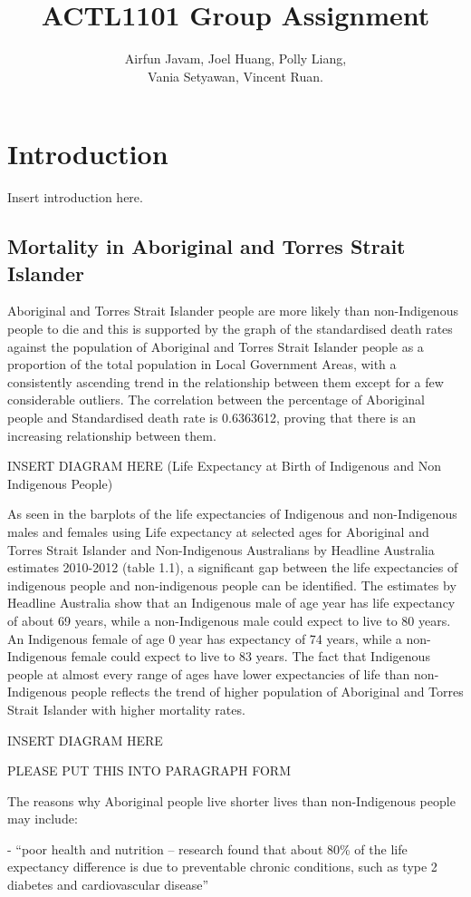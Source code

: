 \documentclass[12pt,a4paper]{article}
\title{ACTL1101 Group Assignment}
\author{Airfun Javam, Joel Huang, Polly Liang,\\Vania Setyawan, Vincent Ruan.}
\date{}
\begin{document}
	\maketitle
	\section{Introduction}
	Insert introduction here.
	\subsection{Mortality in Aboriginal and Torres Strait Islander}
	Aboriginal and Torres Strait Islander people are more likely than non-Indigenous people to die and this is supported by the graph of the standardised death rates against the population of Aboriginal and Torres Strait Islander people as a proportion of the total population in Local Government Areas, with a consistently ascending trend in the relationship between them except for a few considerable outliers. The correlation between the percentage of Aboriginal people and Standardised death rate is 0.6363612, proving that there is an increasing relationship between them. 
	
	INSERT DIAGRAM HERE (Life Expectancy at Birth of Indigenous and Non Indigenous People)
	
	As seen in the barplots of the life expectancies of Indigenous and non-Indigenous males and females using Life expectancy at selected ages for Aboriginal and Torres Strait Islander and Non-Indigenous Australians by Headline Australia estimates 2010-2012 (table 1.1), a significant gap between the life expectancies of indigenous people and non-indigenous people can be identified. The estimates by Headline Australia show that an Indigenous male of age year has life expectancy of about 69 years, while a non-Indigenous male could expect to live to 80 years. An Indigenous female of age 0 year has expectancy of 74 years, while a non-Indigenous female could expect to live to 83 years. 
	The fact that Indigenous people at almost every range of ages have lower expectancies of life than non-Indigenous people reflects the trend of higher population of Aboriginal and Torres Strait Islander with higher mortality rates. 
	
	INSERT DIAGRAM HERE
	
	PLEASE PUT THIS INTO PARAGRAPH FORM
	
	The reasons why Aboriginal people live shorter lives than non-Indigenous people may include:
	
	- “poor health and nutrition – research found that about 80\% of the life expectancy difference is due to preventable chronic conditions, such as type 2 diabetes and cardiovascular disease”
	
\end{document}

